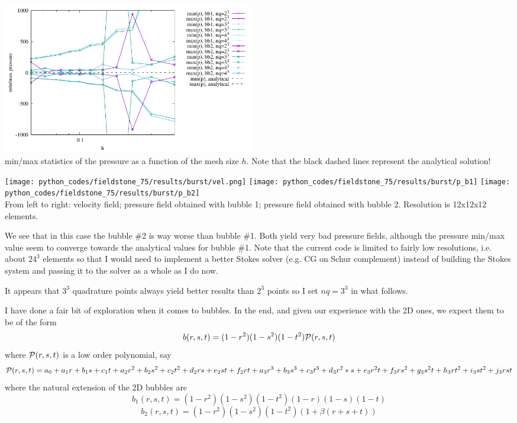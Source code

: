 \begin{center}
\includegraphics[width=11cm]{python_codes/fieldstone_75/results/burst/p_stats.pdf}\\
{\captionfont min/max statistics of the pressure as a function of the mesh size $h$. Note that 
the black dashed lines represent the analytical solution!}
\end{center}

\begin{center}
\texttt{[image: python\_codes/fieldstone\_75/results/burst/vel.png]}
\texttt{[image: python\_codes/fieldstone\_75/results/burst/p\_b1]}
\texttt{[image: python\_codes/fieldstone\_75/results/burst/p\_b2]}\\
{\captionfont From left to right: velocity field; pressure field obtained with bubble 1;
pressure field obtained with bubble 2. Resolution is 12x12x12 elements.}
\end{center}

We see that in this case the bubble \#2 is way worse than bubble \#1. Both 
yield very bad pressure fields, although the pressure min/max value seem to converge 
towards the analytical values for bubble \#1. 
Note that the current code is limited to fairly low resolutions, i.e. about $24^3$ elements so that
I would need to implement a better Stokes solver (e.g. CG on Schur complement) instead 
of building the Stokes system and passing it to the solver as a whole as I do now. %

It appears that $3^3$ quadrature points always yield better results than $2^3$ points
so I set $nq=3^3$ in what follows.

\newpage
I have done a fair bit of exploration when it comes to bubbles.
In the end, and given our experience with the 2D ones, we expect them  
to be of the form 
\[
b(r,s,t) = (1-r^2)(1-s^2)(1-t^2) {\cal P}(r,s,t)
\]
where ${\cal P}(r,s,t)$ is a low order polynomial, say
\[
{\cal P}(r,s,t) =  
a_0 + a_1r + b_1s + c_1t +
a_2 r^2  + b_2 s^2 + c_2 t^2 + 
d_2 rs   + e_2st + f_2rt +
a_3 r^3  + b_3 s^3 + c_3 t^3 + d_3 r^2 *s + e_3 r^2 t + f_3 r s^2 + g_3 s^2 t +
h_3 rt^2 + i_3 st^2 + j_3 rst
\] 
where the natural extension of the 2D bubbles are 
\[
b_1(r,s,t) = (1-r^2)(1-s^2)(1-t^2)(1-r)(1-s)(1-t) 
\]
\[
b_2(r,s,t) = (1-r^2)(1-s^2)(1-t^2) (1+\beta(r+s+t))
\]















